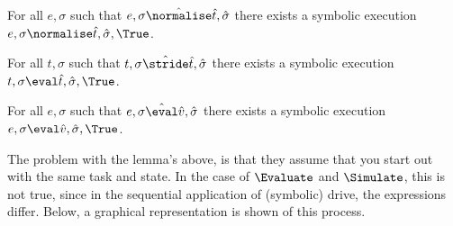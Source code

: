 \begin{lemma}
  \label{lem:completeNormalise}
  For all $e,\sigma$ such that $e,\sigma \hat{\normalise}\hat{t},\hat{\sigma}$
  there exists a symbolic execution $e,\sigma\normalise \hat{t},\hat{\sigma},\True$.
\end{lemma}

\begin{lemma}
  \label{lem:completeStride}
  For all $t,\sigma$ such that $t,\sigma \hat{\stride}\hat{t},\hat{\sigma}$
  there exists a symbolic execution $t,\sigma\eval \hat{t},\hat{\sigma},\True$.
\end{lemma}

\begin{lemma}
  \label{lem:completeEval}
    For all $e,\sigma$ such that $e,\sigma \hat{\eval}\hat{v},\hat{\sigma}$
    there exists a symbolic execution $e,\sigma\eval \hat{v},\hat{\sigma},\True$.
\end{lemma}

The problem with the lemma's above, is that they assume that you start out with the same task and state.
In the case of $\Evaluate$ and $\Simulate$, this is not true, since in the sequential application of (symbolic) drive, the expressions differ.
Below, a graphical representation is shown of this process.

